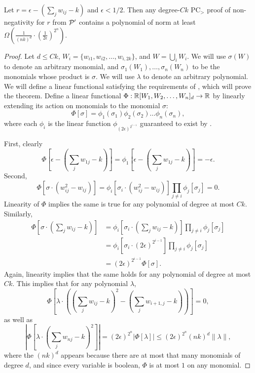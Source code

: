 \begin{lemma}\label{lem:boolean-complex}
Let $r = \epsilon - \left(\sum_j w_{ij} - k\right)$ and $\epsilon < 1/2$. Then any degree-$Ck$ PC$_>$ proof of non-negativity for $r$ from $\mathcal P'$ contains a polynomial of norm at least $\Omega\left(\frac{1}{(nk)^d} \cdot \left(\frac{1}{2\epsilon}\right)^{2^n}\right)$.
\end{lemma}
\begin{proof}
Let $d \leq Ck$, $W_i = \{w_{i1}, w_{i2}, \dots, w_{i,2k}\}$, and $W = \bigcup_i W_i$. We will use $\sigma(W)$ to denote an arbitrary monomial, and $\sigma_1(W_1),\dots,\sigma_n(W_n)$ to be the monomials whose product is $\sigma$. We will use $\lambda$ to denote an arbitrary polynomial. We will define a linear functional satisfying the requirements of , which will prove the theorem. Define a linear functional $\Phi: \mathbb R[W_1,W_2,\dots,W_n]_d \rightarrow \mathbb R$ by linearly extending its action on monomials to the monomial $\sigma$:
\[\Phi[\sigma] = \phi_1(\sigma_1)\phi_2(\sigma_2)\dots\phi_n(\sigma_n),\]
where each $\phi_i$ is the linear function $\phi_{(2\epsilon)^{2^{i-1}}}$ guaranteed to exist by .

First, clearly 
\[\Phi\left[\epsilon - \left(\sum_j w_{1j} - k\right)\right] = \phi_1\left[\epsilon - \left(\sum_j w_{1j} - k\right)\right] = -\epsilon.\]
Second, 
\[\Phi\left[\sigma\cdot(w_{ij}^2 - w_{ij})\right] = \phi_i\left[\sigma_i\cdot (w_{ij}^2 - w_{ij})\right]\prod_{j \neq i}\phi_j[\sigma_j] = 0.\] 
Linearity of $\Phi$ implies the same is true for any polynomial of degree at most $Ck$. Similarly, 
\begin{align*}
\Phi\left[\sigma\cdot\left(\sum_j w_{ij} - k\right)\right] &= \phi_i\left[\sigma_i \cdot \left(\sum_j w_{ij} - k\right)\right]\prod_{j \neq i}\phi_j[\sigma_j] \\
&= \phi_i\left[\sigma_i \cdot (2\epsilon)^{2^{i-1}}\right] \prod_{j \neq i}\phi_j[\sigma_j] \\
&= (2\epsilon)^{2^{i-1}} \Phi[\sigma].
\end{align*}
Again, linearity implies that the same holds for any polynomial of degree at most $Ck$. This implies that for any polynomial $\lambda$, 
\[\Phi\left[\lambda\cdot \left(\left(\sum_{j} w_{ij} - k\right)^2 - \left(\sum_j w_{i+1,j} - k\right)\right)\right] = 0,\]
as well as
\[\left|\Phi\left[\lambda \cdot \left(\sum_j w_{nj} - k\right)^2\right]\right| = (2\epsilon)^{2^n}\left|\Phi[\lambda]\right| \leq (2\epsilon)^{2^n}(nk)^d\|\lambda\|,\]
where the $(nk)^d$ appears because there are at most that many monomials of degree $d$, and since every variable is boolean, $\Phi$ is at most $1$ on any monomial. 


\end{proof}
